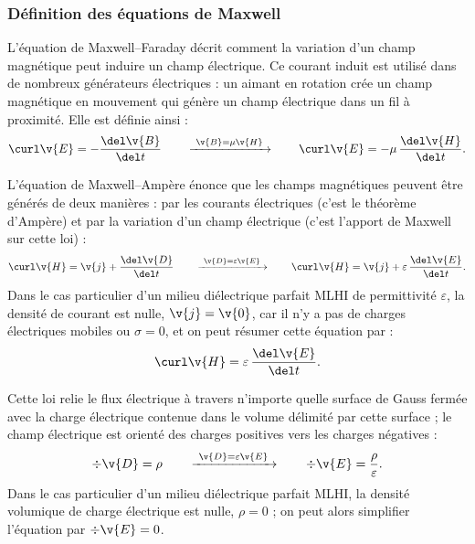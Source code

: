 \subsubsection{Définition des équations de Maxwell}

\begin{definition}
  L'équation de Maxwell--Faraday décrit comment la variation d'un champ
  magnétique peut induire un champ électrique. Ce courant induit est utilisé
  dans de nombreux générateurs électriques : un aimant en rotation crée un champ
  magnétique en mouvement qui génère un champ électrique dans un fil à
  proximité. Elle est définie ainsi :
  \[
    \curl \v{E} = -\frac{\del \v{B}}{\del t}
    \qquad\xrightarrow{\ \v{B} = \mu\v{H}\ }\qquad
    \curl \v{E} = -\mu\,\frac{\del \v{H}}{\del t}.
  \]
\end{definition}

\begin{definition}
  L'équation de Maxwell--Ampère énonce que les champs magnétiques peuvent être
  générés de deux manières : par les courants électriques (c'est le théorème
  d'Ampère) et par la variation d'un champ électrique (c'est l'apport de
  Maxwell sur cette loi) :
  \[
    \curl \v{H} = \v{j} + \frac{\del \v{D}}{\del t}
    \qquad\xrightarrow{\ \v{D} = \varepsilon\v{E}\ }\qquad
    \curl \v{H} = \v{j} + \varepsilon\,\frac{\del \v{E}}{\del t}.
  \]
  Dans le cas particulier d'un milieu diélectrique parfait MLHI de permittivité
  $\varepsilon$, la densité de courant est nulle, $\v{j} = \v{0}$, car il n'y a
  pas de charges électriques mobiles ou $\sigma = 0$, et on peut résumer cette
  équation par :
  \[
    \curl \v{H} = \varepsilon\,\frac{\del \v{E}}{\del t}.
  \]
\end{definition}

\begin{definition}
  Cette loi relie le flux électrique à travers n'importe quelle surface de Gauss
  fermée avec la charge électrique contenue dans le volume délimité par cette
  surface ; le champ électrique est orienté des charges positives vers les
  charges négatives :
  \[
    \div \v{D} = \rho
    \qquad\xrightarrow{\ \v{D} = \varepsilon\v{E}\ }\qquad
    \div \v{E} = \frac{\rho}{\varepsilon}.
  \]
  Dans le cas particulier d'un milieu diélectrique parfait MLHI, la densité
  volumique de charge électrique est nulle, $\rho = 0$ ; on peut alors
  simplifier l'équation par $\div \v{E} = 0$.
\end{definition}

